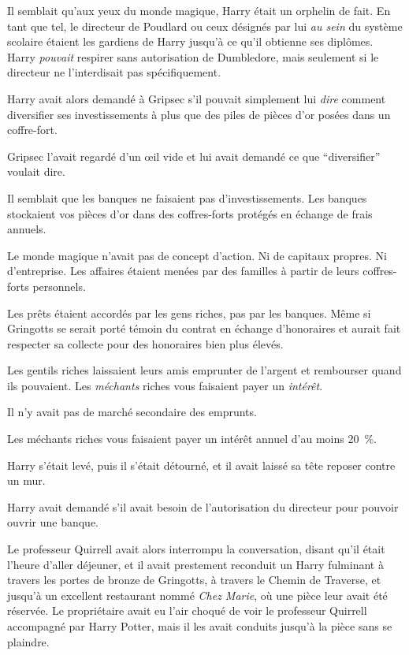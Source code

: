 Il semblait qu'aux yeux du monde magique, Harry était un orphelin de fait.
En tant que tel, le directeur de Poudlard ou ceux désignés par lui \emph{au sein} du système scolaire étaient les gardiens de Harry jusqu'à ce qu'il obtienne ses diplômes.
Harry \emph{pouvait} respirer sans autorisation de Dumbledore, mais seulement si le directeur ne l'interdisait pas spécifiquement.

Harry avait alors demandé à Gripsec s'il pouvait simplement lui \emph{dire} comment diversifier ses investissements à plus que des piles de pièces d'or posées dans un coffre-fort.

Gripsec l'avait regardé d'un œil vide et lui avait demandé ce que “diversifier” voulait dire.

Il semblait que les banques ne faisaient pas d'investissements.
Les banques stockaient vos pièces d'or dans des coffres-forts protégés en échange de frais annuels.

Le monde magique n'avait pas de concept d'action.
Ni de capitaux propres.
Ni d'entreprise.
Les affaires étaient menées par des familles à partir de leurs coffres-forts personnels.

Les prêts étaient accordés par les gens riches, pas par les banques.
Même si Gringotts se serait porté témoin du contrat en échange d'honoraires et aurait fait respecter sa collecte pour des honoraires bien plus élevés.

Les gentils riches laissaient leurs amis emprunter de l'argent et rembourser quand ils pouvaient.
Les \emph{méchants} riches vous faisaient payer un \emph{intérêt}.

Il n'y avait pas de marché secondaire des emprunts.

Les méchants riches vous faisaient payer un intérêt annuel d'au moins 20~\%.

Harry s'était levé, puis il s'était détourné, et il avait laissé sa tête reposer contre un mur.

Harry avait demandé s'il avait besoin de l'autorisation du directeur pour pouvoir ouvrir une banque.

Le professeur Quirrell avait alors interrompu la conversation, disant qu'il était l'heure d'aller déjeuner, et il avait prestement reconduit un Harry fulminant à travers les portes de bronze de Gringotts, à travers le Chemin de Traverse, et jusqu'à un excellent restaurant nommé \emph{Chez Marie}, où une pièce leur avait été réservée.
Le propriétaire avait eu l'air choqué de voir le professeur Quirrell accompagné par Harry Potter, mais il les avait conduits jusqu'à la pièce sans se plaindre.

